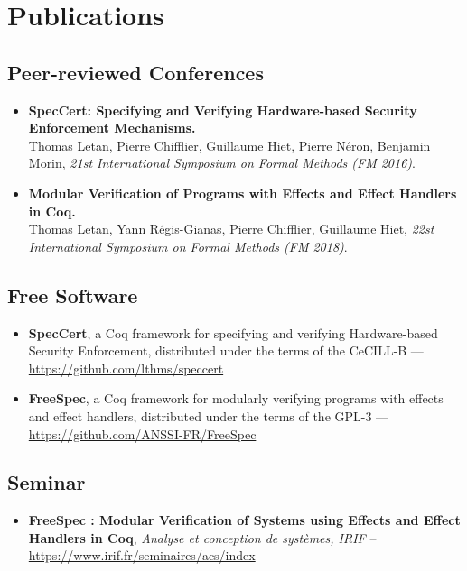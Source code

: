 \chapter{Publications}

\section{Peer-reviewed Conferences}

\begin{itemize}
\item \textbf{SpecCert: Specifying and Verifying Hardware-based Security
    Enforcement
    Mechanisms.} \\
  Thomas Letan, Pierre Chifflier, Guillaume Hiet, Pierre Néron, Benjamin Morin,
  \emph{21st International Symposium on Formal Methods (FM 2016)}.
\item \textbf{Modular Verification of Programs with Effects and Effect
    Handlers in Coq.} \\
  Thomas Letan, Yann Régis-Gianas, Pierre Chifflier, Guillaume Hiet, \emph{22st
    International Symposium on Formal Methods (FM 2018)}.
\end{itemize}

\section{Free Software}

\begin{itemize}
\item \textbf{SpecCert}, a Coq framework for specifying and verifying
  Hardware-based Security Enforcement, distributed under the terms of the
  CeCILL-B --- \url{https://github.com/lthms/speccert}
\item \textbf{FreeSpec}, a Coq framework for modularly verifying programs
  with effects and effect handlers, distributed under the terms of the GPL-3 ---
  \url{https://github.com/ANSSI-FR/FreeSpec}
\end{itemize}

\section{Seminar}

\begin{itemize}
\item \textbf{FreeSpec : Modular Verification of Systems using Effects and
    Effect Handlers in Coq}, \emph{Analyse et conception de systèmes, IRIF} --
  \url{https://www.irif.fr/seminaires/acs/index}
\end{itemize}
